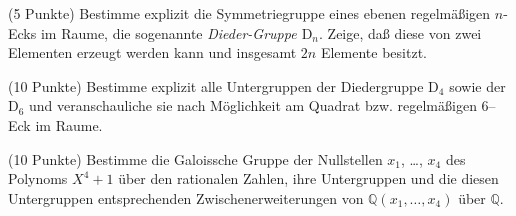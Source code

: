 \documentclass[a4paper,10pt]{algsheet}
\author{Dipl.-Math.~Franz Vogler}
\date{01.~Februar 2011}
\begin{document}
                \maketitle



\begin{exercise}(5 Punkte)\newline
    Bestimme explizit die Symmetriegruppe eines ebenen regelmäßigen \(n\)-Ecks
    im Raume, die sogenannte \emph{Dieder-Gruppe \(\mathrm D_n\)}. Zeige, daß diese
    von zwei Elementen erzeugt werden kann und insgesamt \(2n\) Elemente besitzt.
\end{exercise}


\begin{exercise}(10 Punkte)\newline
    Bestimme explizit alle Untergruppen der Diedergruppe \(\mathrm D_4\)
    sowie der \(\mathrm D_6\) und veranschauliche
    sie nach Möglichkeit am Quadrat bzw. regelmäßigen 6--Eck im Raume.
\end{exercise}


\begin{exercise}(10 Punkte)\newline
    Bestimme die Galoissche Gruppe der Nullstellen
    \(x_1\), \dots, \(x_4\)
    des Polynoms \(X^4 + 1\) über den rationalen Zahlen, ihre Untergruppen
    und die diesen Untergruppen entsprechenden
    Zwischenerweiterungen von \(\mathbb Q(x_1, \dotsc, x_4)\) über \(\mathbb Q\).
\end{exercise}


\end{document}
